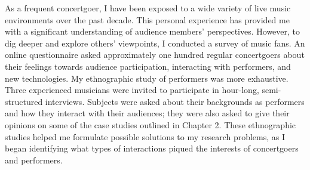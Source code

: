
As a frequent concertgoer, I have been exposed to a wide variety of live music environments over the past decade. This personal experience has provided me with a significant understanding of audience members' perspectives. However, to dig deeper and explore others' viewpoints, I conducted a survey of music fans. An online questionnaire asked approximately one hundred regular concertgoers about their feelings towards audience participation, interacting with performers, and new technologies. My ethnographic study of performers was more exhaustive. Three experienced musicians were invited to participate in hour-long, semi-structured interviews. Subjects were asked about their backgrounds as performers and how they interact with their audiences; they were also asked to give their opinions on some of the case studies outlined in Chapter 2. These ethnographic studies helped me formulate possible solutions to my research problems, as I began identifying what types of interactions piqued the interests of concertgoers and performers.

